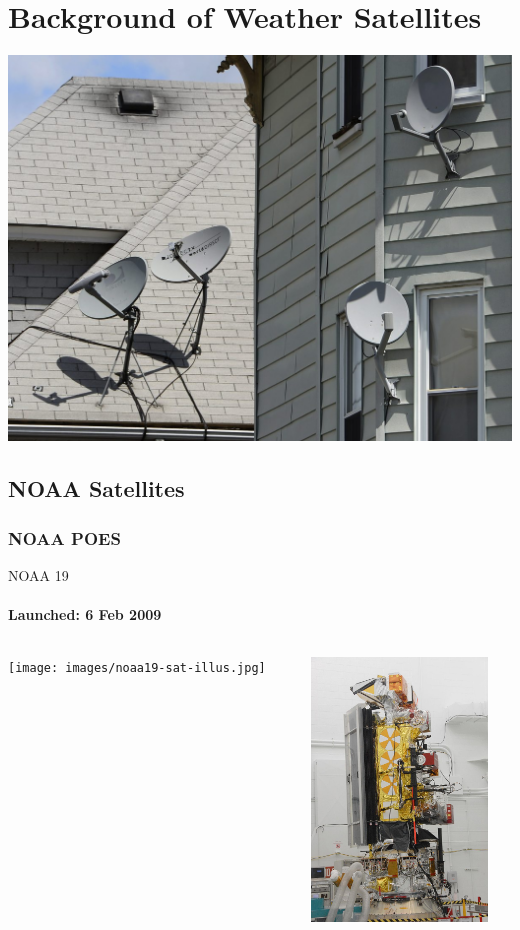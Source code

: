 \documentclass[]{beamer}
\begin{document}
\section[Background]{Background of Weather Satellites}
\begin{frame}
    \includegraphics[]{images/dish.jpg}
\end{frame}
\subsection{NOAA Satellites}
\subsubsection{NOAA POES}
\begin{frame}{NOAA 19}
    \framesubtitle{Launched: 6 Feb 2009}
    \begin{columns}[T]
        \begin{column}[T]{5cm}
            \texttt{[image: images/noaa19-sat-illus.jpg]}
        \end{column}
        \begin{column}[T]{5cm}
            \includegraphics[height=7cm]{images/noaa19-sat.jpg}
        \end{column}
    \end{columns}
\end{frame}
\end{document}

